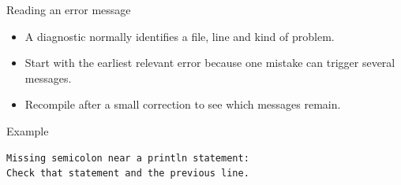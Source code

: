 \documentclass[10pt,aspectratio=169]{beamer}
\begin{document}
\begin{frame}[fragile,t]{Reading an error message}
\begin{itemize}
\item A diagnostic normally identifies a file, line and kind of problem.
\item Start with the earliest relevant error because one mistake can trigger several messages.
\item Recompile after a small correction to see which messages remain.
\end{itemize}
\vspace{1mm}\begin{block}{Example}
\begin{lstlisting}
Missing semicolon near a println statement:
Check that statement and the previous line.
\end{lstlisting}
\end{block}
\end{frame}
\end{document}
